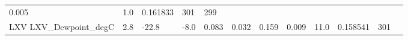 \documentclass[11pt]{article}
\begin{document}
\begin{longtable}[]{@{}llllllllllll@{}}
\begin{minipage}[t]{0.04\columnwidth}
0.005\strut
\end{minipage} & \begin{minipage}[t]{0.05\columnwidth}\raggedright\strut
1.0\strut
\end{minipage} & \begin{minipage}[t]{0.05\columnwidth}\raggedright\strut
0.161833\strut
\end{minipage} & \begin{minipage}[t]{0.05\columnwidth}\raggedright\strut
301\strut
\end{minipage} & \begin{minipage}[t]{0.07\columnwidth}\raggedright\strut
299\strut
\end{minipage}\tabularnewline
\begin{minipage}[t]{0.18\columnwidth}\raggedright\strut
LXV LXV\_Dewpoint\_degC\strut
\end{minipage} & \begin{minipage}[t]{0.04\columnwidth}\raggedright\strut
2.8\strut
\end{minipage} & \begin{minipage}[t]{0.04\columnwidth}\raggedright\strut
-22.8\strut
\end{minipage} & \begin{minipage}[t]{0.04\columnwidth}\raggedright\strut
-8.0\strut
\end{minipage} & \begin{minipage}[t]{0.04\columnwidth}\raggedright\strut
0.083\strut
\end{minipage} & \begin{minipage}[t]{0.05\columnwidth}\raggedright\strut
0.032\strut
\end{minipage} & \begin{minipage}[t]{0.04\columnwidth}\raggedright\strut
0.159\strut
\end{minipage} & \begin{minipage}[t]{0.04\columnwidth}\raggedright\strut
0.009\strut
\end{minipage} & \begin{minipage}[t]{0.05\columnwidth}\raggedright\strut
11.0\strut
\end{minipage} & \begin{minipage}[t]{0.05\columnwidth}\raggedright\strut
0.158541\strut
\end{minipage} & \begin{minipage}[t]{0.05\columnwidth}\raggedright\strut
301\strut
\end{minipage} & \begin{minipage}[t]{0.07\columnwidth}\raggedright\strut

\end{minipage}
\end{longtable}
\end{document}
